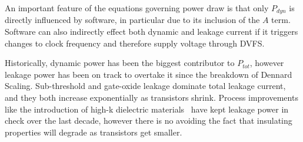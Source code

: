An important feature of the equations governing power draw is that only $P_{dyn}$ is directly influenced by software, in particular due to its inclusion of the $A$ term. Software can also indirectly effect both dynamic and leakage current if it triggers changes to clock frequency and therefore supply voltage through DVFS.  

Historically, dynamic power has been the biggest contributor to $P_{tot}$, however leakage power has been on track to overtake it since the breakdown of Dennard Scaling.  Sub-threshold and gate-oxide leakage dominate total leakage current, and they both increase exponentially as transistors shrink. Process improvements like the introduction of high-k dielectric materials~\cite{jan:2009aa} have kept leakage power in check over the last decade, however there is no avoiding the fact that insulating properties will degrade as transistors get smaller.